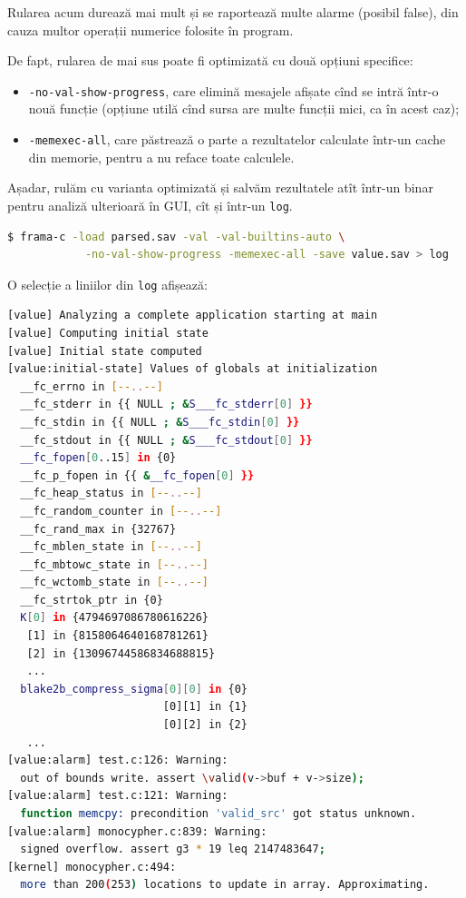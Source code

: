 Rularea acum durează mai mult și se raportează multe alarme (posibil false),
din cauza multor operații numerice folosite în program.

De fapt, rularea de mai sus poate fi optimizată cu două opțiuni specifice:
\begin{itemize}
\item \texttt{-no-val-show-progress}, care elimină mesajele afișate cînd se intră
  într-o nouă funcție (opțiune utilă cînd sursa are multe funcții mici, ca în acest
  caz);
\item \texttt{-memexec-all}, care păstrează o parte a rezultatelor calculate
  într-un cache din memorie, pentru a nu reface toate calculele.
\end{itemize}

Așadar, rulăm cu varianta optimizată și salvăm rezultatele atît într-un binar
pentru analiză ulterioară în GUI, cît și într-un \texttt{log}.
\begin{lstlisting}[language=sh,caption={\emph{Verificarea optimizată cu Eva}}]
  $ frama-c -load parsed.sav -val -val-builtins-auto \
            -no-val-show-progress -memexec-all -save value.sav > log
\end{lstlisting}

\newpage

O selecție a liniilor din \texttt{log} afișează:
\begin{lstlisting}[language=sh,caption={\emph{Fragment din rezultatele verificării inițiale cu Eva}}]
[value] Analyzing a complete application starting at main
[value] Computing initial state
[value] Initial state computed
[value:initial-state] Values of globals at initialization
  __fc_errno in [--..--]
  __fc_stderr in {{ NULL ; &S___fc_stderr[0] }}
  __fc_stdin in {{ NULL ; &S___fc_stdin[0] }}
  __fc_stdout in {{ NULL ; &S___fc_stdout[0] }}
  __fc_fopen[0..15] in {0}
  __fc_p_fopen in {{ &__fc_fopen[0] }}
  __fc_heap_status in [--..--]
  __fc_random_counter in [--..--]
  __fc_rand_max in {32767}
  __fc_mblen_state in [--..--]
  __fc_mbtowc_state in [--..--]
  __fc_wctomb_state in [--..--]
  __fc_strtok_ptr in {0}
  K[0] in {4794697086780616226}
   [1] in {8158064640168781261}
   [2] in {13096744586834688815}
   ...
  blake2b_compress_sigma[0][0] in {0}
                        [0][1] in {1}
                        [0][2] in {2}
   ...
[value:alarm] test.c:126: Warning: 
  out of bounds write. assert \valid(v->buf + v->size);
[value:alarm] test.c:121: Warning: 
  function memcpy: precondition 'valid_src' got status unknown.
[value:alarm] monocypher.c:839: Warning: 
  signed overflow. assert g3 * 19 leq 2147483647;
[kernel] monocypher.c:494: 
  more than 200(253) locations to update in array. Approximating.
\end{lstlisting}

